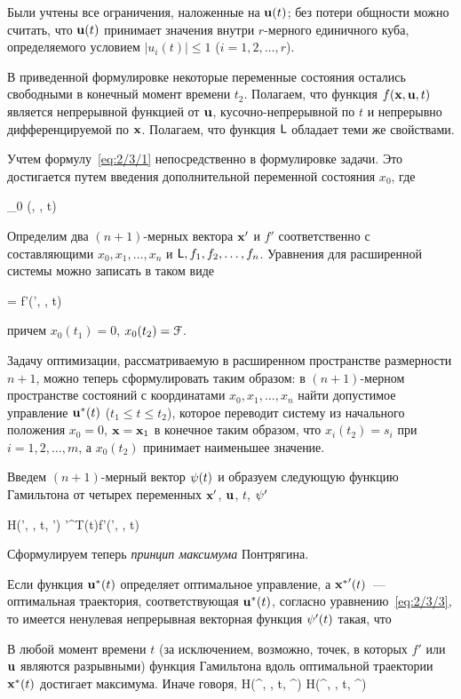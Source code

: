     \item
        Были учтены все ограничения, наложенные на $\mathbf{u}(t)$; без потери общности можно считать, что $\mathbf{u}(t)$ принимает значения внутри $r$-мерного единичного куба, определяемого условием $|u_i(t)| \leqslant 1$ ($i = 1,2,\ldots,r$).
\eenum

В приведенной формулировке некоторые переменные состояния остались свободными в конечный момент времени $t_2$. Полагаем, что функция $f(\mathbf{x}, \mathbf{u}, t)$ является непрерывной функцией от $\mathbf{u}$, кусочно-непрерывной по $t$ и непрерывно дифференцируемой по $\mathbf{x}$. Полагаем, что функция $\mathsf{L}$ обладает теми же свойствами.

Учтем формулу~\ref{eq:2/3/1} непосредственно в формулировке задачи. Это достигается путем введения дополнительной переменной состояния $x_0$, где

    _0 \equiv \funcL(, , t) 
\eeq

Определим два $(n+1)$-мерных вектора $\mathbf{x}'$ и $f'$ соответственно с составляющими $x_0, x_1, \ldots, x_n$ и $\mathsf{L}, f_1, f_2, \ldots, f_n$. Уравнения для расширенной системы можно записать в таком виде

     = f'(', , t) \text{,}
\eeq

причем $x_0(t_1) = 0$, $x_0(t_2) = \mathcal{F}$.

Задачу оптимизации, рассматриваемую в расширенном пространстве размерности $n+1$, можно теперь сформулировать таким образом: в $(n+1)$-мерном пространстве состояний с координатами $x_0, x_1, \ldots, x_n$ найти допустимое управление ${\mathbf{u}^{*}}(t)$ ($t_1 \leqslant t \leqslant t_2$), которое переводит систему из начального положения $x_0 = 0$, $\mathbf{x} = \mathbf{x}_1$ в конечное таким образом, что $x_i(t_2) = s_i$ при $i = 1, 2, \ldots, m$, а $x_0(t_2)$ принимает наименьшее значение.

Введем $(n+1)$-мерный вектор $\mathbf{\psi}(t)$ и образуем следующую функцию Гамильтона от четырех переменных $\mathbf{x}'$, $\mathbf{u}$, $t$, $\mathbf{\psi}'$

    H(', , t, \m{\psi}') \eqdef \m{\psi}'^T(t)f'(', , t) 
\eeq

Сформулируем теперь \emph{принцип максимума} Понтрягина.

    Если функция ${\mathbf{u}^{*}}(t)$ определяет оптимальное управление, а ${\mathbf{x}^{*}}^\prime(t)$~--- оптимальная траектория, соответствующая ${\mathbf{u}^{*}}(t)$, согласно уравнению~\ref{eq:2/3/3}, то имеется ненулевая непрерывная векторная функция $\mathbf{\psi}^\prime(t)$ такая, что
    \benum
        \item
            В любой момент времени $t$ (за исключением, возможно, точек, в которых $f'$ или $\mathbf{u}$ являются разрывными) функция Гамильтона вдоль оптимальной траектории ${\mathbf{x}^{*}}(t)$ достигает максимума. Иначе говоря,
            \beqn
                H(\optX^\prime, \optU, t, \m{\psi}^\prime) \geqslant H(\optX^\prime, , t, \m{\psi}^\prime) 
            \eeqn

